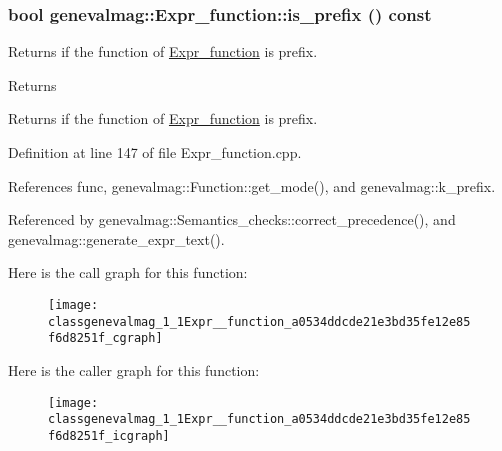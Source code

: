 \hypertarget{classgenevalmag_1_1Expr__function_a0534ddcde21e3bd35fe12e85f6d8251f}{
\subsubsection[{is\_\-prefix}]{\setlength{\rightskip}{0pt plus 5cm}bool genevalmag::Expr\_\-function::is\_\-prefix () const}}
\label{classgenevalmag_1_1Expr__function_a0534ddcde21e3bd35fe12e85f6d8251f}
Returns if the function of \hyperlink{classgenevalmag_1_1Expr__function}{Expr\_\-function} is prefix. \begin{DoxyReturn}{Returns}

\end{DoxyReturn}
Returns if the function of \hyperlink{classgenevalmag_1_1Expr__function}{Expr\_\-function} is prefix. 

Definition at line 147 of file Expr\_\-function.cpp.



References func, genevalmag::Function::get\_\-mode(), and genevalmag::k\_\-prefix.



Referenced by genevalmag::Semantics\_\-checks::correct\_\-precedence(), and genevalmag::generate\_\-expr\_\-text().



Here is the call graph for this function:\nopagebreak
\begin{figure}[H]
\begin{center}
\leavevmode
\texttt{[image: classgenevalmag\_1\_1Expr\_\_function\_a0534ddcde21e3bd35fe12e85f6d8251f\_cgraph]}
\end{center}
\end{figure}




Here is the caller graph for this function:\nopagebreak
\begin{figure}[H]
\begin{center}
\leavevmode
\texttt{[image: classgenevalmag\_1\_1Expr\_\_function\_a0534ddcde21e3bd35fe12e85f6d8251f\_icgraph]}
\end{center}
\end{figure}


